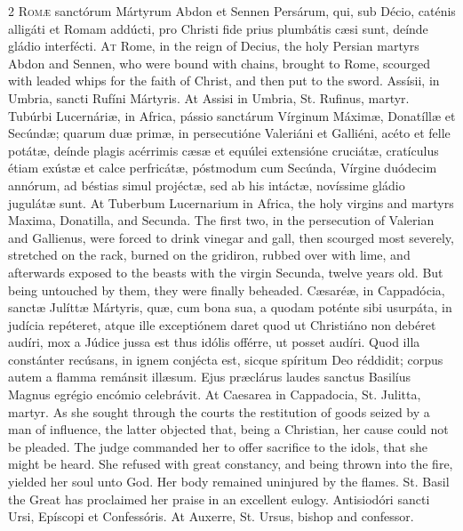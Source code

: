 \begin{paracol}{2}
\lettrine[lines=2]{R}{omæ} sanctórum Mártyrum 
 Abdon et Sennen Persárum, qui, sub Décio, caténis alligáti et Romam addúcti, 
 pro Christi fide prius plumbátis cæsi sunt, deínde gládio interfécti.
\switchcolumn
{}
\lettrine[lines=2]{A}{t} Rome, in the reign of Decius, the 
 holy Persian martyrs Abdon and Sennen, who were bound with chains, brought 
 to Rome, scourged with leaded whips for the faith of Christ, and then put to 
 the sword.
\switchcolumn*
{}
Assísii, in Umbria, 
 sancti Rufíni Mártyris.
\switchcolumn
{}
At Assisi in Umbria, St. Rufinus, 
 martyr.
\switchcolumn*
{}
Tubúrbi Lucernáriæ, in 
 Africa, pássio sanctárum Vírginum Máximæ, Donatíllæ et Secúndæ; quarum duæ 
 primæ, in persecutióne Valeriáni et Galliéni, acéto et felle potátæ, deínde 
 plagis acérrimis cæsæ et equúlei extensióne cruciátæ, cratículus étiam 
 exústæ et calce perfricátæ, póstmodum cum Secúnda, Vírgine duódecim annórum, 
 ad béstias simul projéctæ, sed ab his intáctæ, novíssime gládio jugulátæ 
 sunt.
\switchcolumn
{}
At Tuberbum Lucernarium in Africa, 
 the holy virgins and martyrs Maxima, Donatilla, and Secunda. The first 
 two, in the persecution of Valerian and Gallienus, were forced to drink 
 vinegar and gall, then scourged most severely, stretched on the rack, 
 burned on the gridiron, rubbed over with lime, and afterwards exposed to the 
 beasts with the virgin Secunda, twelve years old. But being untouched 
 by them, they were finally beheaded.
\switchcolumn*
{}
Cæsaréæ, in Cappadócia, sanctæ Julíttæ Mártyris, quæ, cum bona sua, a quodam poténte sibi usurpáta, 
 in judícia repéteret, atque ille exceptiónem daret quod ut Christiáno non 
 debéret audíri, mox a Júdice jussa est thus idólis offérre, ut posset audíri. 
 Quod illa constánter recúsans, in ignem conjécta est, sicque spíritum Deo 
 réddidit; corpus autem a flamma remánsit illæsum. Ejus præclárus 
 laudes sanctus Basilíus Magnus egrégio encómio celebrávit.
\switchcolumn
{}
At Caesarea in Cappadocia, St. 
 Julitta, martyr. As she sought through the courts the restitution of 
 goods seized by a man of influence, the latter objected that, being a 
 Christian, her cause could not be pleaded. The judge commanded her to 
 offer sacrifice to the idols, that she might be heard. She refused 
 with great constancy, and being thrown into the fire, yielded her soul unto 
 God. Her body remained uninjured by the flames. St. Basil the 
 Great has proclaimed her praise in an excellent eulogy.
\switchcolumn*
{}
Antisiodóri sancti Ursi, 
 Epíscopi et Confessóris.
\switchcolumn
{}
At Auxerre, St. Ursus, bishop and 
 confessor.
\switchcolumn*
{}
\end{paracol}


